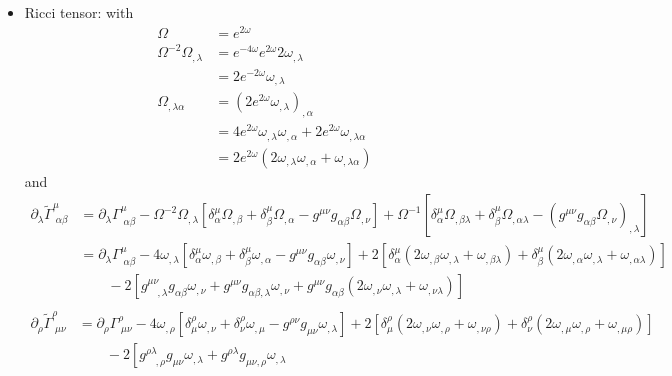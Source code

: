 \documentclass[10pt,a4paper]{article}
\theoremstyle{definition}
\begin{document}
\begin{itemize}
\item Ricci tensor: with
\begin{align}
    \Omega&=e^{2\omega}\\
    \Omega^{-2}\Omega_{,\lambda}
    &=e^{-4\omega}e^{2\omega}2\omega_{,\lambda}\\
    &=2e^{-2\omega}\omega_{,\lambda}\\
    \Omega_{,\lambda\alpha}
    &=\left(2e^{2\omega}\omega_{,\lambda}\right)_{,\alpha}\\
    &=4e^{2\omega}\omega_{,\lambda}\omega_{,\alpha}+2e^{2\omega}\omega_{,\lambda\alpha}\\
    &=2e^{2\omega}\left(2\omega_{,\lambda}\omega_{,\alpha}+\omega_{,\lambda\alpha}\right)
\end{align}
and
\begin{align}
\partial_\lambda\tilde\Gamma^\mu_{\;\alpha\beta}
&=\partial_\lambda\Gamma^\mu_{\;\alpha\beta}
-\Omega^{-2}\Omega_{,\lambda}\left[
 \delta^\mu_\alpha\Omega_{,\beta}
+\delta_\beta^\mu\Omega_{,\alpha}
-g^{\mu\nu}g_{\alpha\beta}\Omega_{,\nu}
\right]
+\Omega^{-1}\left[
 \delta^\mu_\alpha\Omega_{,\beta\lambda}
+\delta_\beta^\mu\Omega_{,\alpha\lambda}
-(g^{\mu\nu}g_{\alpha\beta}\Omega_{,\nu})_{,\lambda}
\right]\\
&=\partial_\lambda\Gamma^\mu_{\;\alpha\beta}
-4\omega_{,\lambda}\left[
 \delta^\mu_\alpha\omega_{,\beta}
+\delta_\beta^\mu\omega_{,\alpha}
-g^{\mu\nu}g_{\alpha\beta}\omega_{,\nu}
\right]
+2\left[
 \delta^\mu_\alpha\left(2\omega_{,\beta}\omega_{,\lambda}+\omega_{,\beta\lambda}\right)
+\delta_\beta^\mu\left(2\omega_{,\alpha}\omega_{,\lambda}+\omega_{,\alpha\lambda}\right)\right]\\
&\qquad-2\left[
 g^{\mu\nu}_{\quad,\lambda}g_{\alpha\beta}\omega_{,\nu}
+g^{\mu\nu}g_{\alpha\beta,\lambda}\omega_{,\nu}
+g^{\mu\nu}g_{\alpha\beta}(2\omega_{,\nu}\omega_{,\lambda}+\omega_{,\nu\lambda})\right]\\
\end{align}
\begin{align}
\partial_\rho\tilde\Gamma^\rho_{\;\mu\nu}
&=\partial_\rho\Gamma^\rho_{\;\mu\nu}
-4\omega_{,\rho}\left[
 \delta^\rho_\mu\omega_{,\nu}
+\delta_\nu^\rho\omega_{,\mu}
-g^{\rho\nu}g_{\mu\nu}\omega_{,\lambda}
\right]
+2\left[
 \delta^\rho_\mu\left(2\omega_{,\nu}\omega_{,\rho}+\omega_{,\nu\rho}\right)
+\delta_\nu^\rho\left(2\omega_{,\mu}\omega_{,\rho}+\omega_{,\mu\rho}\right)\right]\\
&\qquad-2\left[
 g^{\rho\lambda}_{\quad,\rho}g_{\mu\nu}\omega_{,\lambda}
+g^{\rho\lambda}g_{\mu\nu,\rho}\omega_{,\lambda}

\end{align}
\end{itemize}
\end{document}
